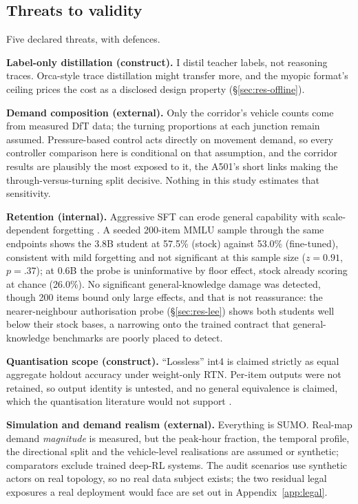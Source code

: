\subsection{Threats to validity}\label{sec:dis-threats}
Five declared threats, with defences.

\textbf{Label-only distillation (construct).} I distil teacher labels, not
reasoning traces. Orca-style trace distillation \cite{mukherjee2023orca}
might transfer more, and the myopic format's ceiling prices the cost as a
disclosed design property (\S\ref{sec:res-offline}).

\textbf{Demand composition (external).} Only the corridor's vehicle counts
come from measured DfT data; the turning proportions at each junction
remain assumed. Pressure-based control acts directly on movement demand,
so every controller comparison here is conditional on that assumption, and
the corridor results are plausibly the most exposed to it, the A501's
short links making the through-versus-turning split decisive. Nothing in
this study estimates that sensitivity.

\textbf{Retention (internal).} Aggressive SFT can erode general capability
with scale-dependent forgetting \cite{forgetting2024}. A seeded 200-item
MMLU sample through the same endpoints shows the 3.8B student at 57.5\%
(stock) against 53.0\% (fine-tuned), consistent with mild forgetting and
not significant at this sample size ($z{=}0.91$, $p{=}.37$); at 0.6B the
probe is uninformative by floor effect, stock already scoring at chance
(26.0\%). No significant general-knowledge damage was detected, though 200
items bound only large effects, and that is not reassurance: the
nearer-neighbour authorisation probe (\S\ref{sec:res-lee}) shows both
students well below their stock bases, a narrowing onto the trained
contract that general-knowledge benchmarks are poorly placed to detect.

\textbf{Quantisation scope (construct).} ``Lossless'' int4 is claimed
strictly as equal aggregate holdout accuracy under weight-only RTN.
Per-item outputs were not retained, so output identity is untested, and no
general equivalence is claimed, which the quantisation literature would
not support \cite{quantlora2024,frantar2022gptq}.

\textbf{Simulation and demand realism (external).} Everything is SUMO.
Real-map demand \emph{magnitude} is measured, but the peak-hour fraction,
the temporal profile, the directional split and the vehicle-level
realisations are assumed or synthetic; comparators exclude trained deep-RL
systems. The audit scenarios use synthetic actors on real topology, so no
real data subject exists; the two residual legal exposures a real
deployment would face are set out in Appendix~\ref{app:legal}.

